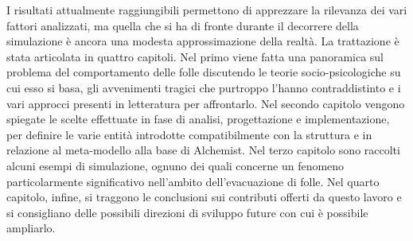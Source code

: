 I risultati attualmente raggiungibili permettono di apprezzare la rilevanza dei vari fattori analizzati, ma quella che si ha di fronte durante il decorrere della simulazione è ancora una modesta approssimazione della realtà. \newline
La trattazione è stata articolata in quattro capitoli. Nel primo viene fatta una panoramica sul problema del comportamento delle folle discutendo le teorie socio-psicologiche su cui esso si basa, gli avvenimenti tragici che purtroppo l'hanno contraddistinto e i vari approcci presenti in letteratura per affrontarlo. \newline
Nel secondo capitolo vengono spiegate le scelte effettuate in fase di analisi, progettazione e implementazione, per definire le varie entità introdotte compatibilmente con la struttura e in relazione al meta-modello alla base di Alchemist.
Nel terzo capitolo sono raccolti alcuni esempi di simulazione, ognuno dei quali concerne un fenomeno particolarmente significativo nell'ambito dell'evacuazione di folle. \newline
Nel quarto capitolo, infine, si traggono le conclusioni sui contributi offerti da questo lavoro e si consigliano delle possibili direzioni di sviluppo future con cui è possibile ampliarlo.